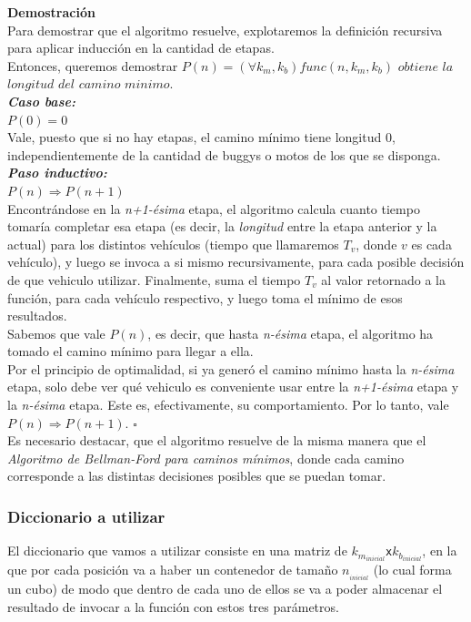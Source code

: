 {\large\textbf{Demostración}}\\
Para demostrar que el algoritmo resuelve, explotaremos la definición recursiva para aplicar inducción en la cantidad de etapas.\\
Entonces, queremos demostrar $P(n)=(\forall k_m, k_b) func(n, k_m, k_b)$ $obtiene$ $la$ $longitud$ $del$ $camino$ $minimo$.\\

\textbf{\emph{Caso base:}}\\
$P(0) = 0$\\
Vale, puesto que si no hay etapas, el camino mínimo tiene longitud 0, independientemente de la cantidad de buggys o motos de los que se disponga.\\

\textbf{\emph{Paso inductivo:}}\\
$P(n)\Rightarrow P(n+1)$\\
Encontrándose en la \emph{n+1-ésima} etapa, el algoritmo calcula cuanto tiempo tomaría completar esa etapa (es decir, la \emph{longitud} entre la etapa anterior y la actual) para los distintos vehículos (tiempo que llamaremos $T_{v}$, donde $v$ es cada vehículo), y luego se invoca a si mismo recursivamente, para cada posible decisión de que vehiculo utilizar. Finalmente, suma el tiempo $T_{v}$ al valor retornado a la función, para cada vehículo respectivo, y luego toma el mínimo de esos resultados.\\
Sabemos que vale $P(n)$, es decir, que hasta \emph{n-ésima} etapa, el algoritmo ha tomado el camino mínimo para llegar a ella.\\
Por el principio de optimalidad, si ya generó el camino mínimo hasta la \emph{n-ésima} etapa, solo debe ver qué vehiculo es conveniente usar entre la \emph{n+1-ésima} etapa y la \emph{n-ésima} etapa. Este es, efectivamente, su comportamiento.
Por lo tanto, vale $P(n) \Rightarrow P(n+1)$. $\square$\\

Es necesario destacar, que el algoritmo resuelve de la misma manera que el \emph{Algoritmo de Bellman-Ford para caminos mínimos}, donde cada camino corresponde a las distintas decisiones posibles que se puedan tomar.

\subsubsection*{Diccionario a utilizar}

El diccionario que vamos a utilizar consiste en una matriz de $k_{m_{inicial}}$\texttt{x}$k_{b_{inicial}}$, en la que por cada posici\'on va a haber un contenedor de tama\~no $n_{_{inicial}}$ (lo cual forma un cubo) de modo que dentro de cada uno de ellos se va a poder almacenar el resultado de invocar a la funci\'on con estos tres par\'ametros.

